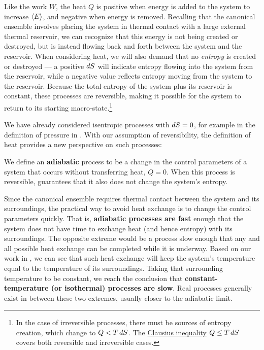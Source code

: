 Like the work $W$, the heat $Q$ is positive when energy is added to the system to increase $\left\langle E \right\rangle$, and negative when energy is removed.
Recalling that the canonical ensemble involves placing the system in thermal contact with a large external thermal reservoir, we can recognize that this energy is not being created or destroyed, but is instead flowing back and forth between the system and the reservoir.
When considering heat, we will also demand that no \emph{entropy} is created or destroyed --- a positive $\mathop{dS}$ will indicate entropy flowing into the system from the reservoir, while a negative value reflects entropy moving from the system to the reservoir.
Because the total entropy of the system plus its reservoir is constant, these processes are reversible, making it possible for the system to return to its starting macro-state.\footnote{In the case of irreversible processes, there must be sources of entropy creation, which change  to $Q < T \mathop{dS}$.  The \href{https://en.wikipedia.org/wiki/Clausius_theorem}{Clausius inequality} $Q \leq T \mathop{dS}$ covers both reversible and irreversible cases.}

We have already considered isentropic processes with $\mathop{dS} = 0$, for example in the definition of pressure in .
With our assumption of reversibility, the definition of heat provides a new perspective on such processes:

\begin{shaded}
  We define an \textbf{adiabatic} process to be a change in the control parameters of a system that occurs without transferring heat, $Q = 0$.
  When this process is reversible,  guarantees that it also does not change the system's entropy.
\end{shaded}

Since the canonical ensemble requires thermal contact between the system and its surroundings, the practical way to avoid heat exchange is to change the control parameters quickly.
That is, \textbf{adiabatic processes are fast} enough that the system does not have time to exchange heat (and hence entropy) with its surroundings.
The opposite extreme would be a process slow enough that any and all possible heat exchange can be completed while it is underway.
Based on our work in , we can see that such heat exchange will keep the system's temperature equal to the temperature of its surroundings.
Taking that surrounding temperature to be constant, we reach the conclusion that \textbf{constant-temperature (or isothermal) processes are slow}.
Real processes generally exist in between these two extremes, usually closer to the adiabatic limit.



